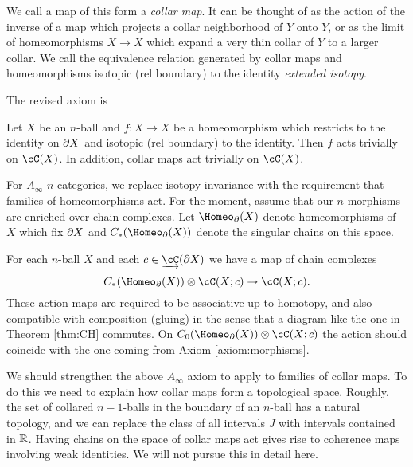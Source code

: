 We call a map of this form a {\it collar map}.
It can be thought of as the action of the inverse of
a map which projects a collar neighborhood of $Y$ onto $Y$,
or as the limit of homeomorphisms $X\to X$ which expand a very thin collar of $Y$
to a larger collar.
We call the equivalence relation generated by collar maps and homeomorphisms
isotopic (rel boundary) to the identity {\it extended isotopy}.

The revised axiom is

\begin{axiom}
\label{axiom:extended-isotopies}
Let $X$ be an $n$-ball and $f: X\to X$ be a homeomorphism which restricts
to the identity on $\partial X$ and isotopic (rel boundary) to the identity.
Then $f$ acts trivially on $\cC(X)$.
In addition, collar maps act trivially on $\cC(X)$.
\end{axiom}

\smallskip

For $A_\infty$ $n$-categories, we replace
isotopy invariance with the requirement that families of homeomorphisms act.
For the moment, assume that our $n$-morphisms are enriched over chain complexes.
Let $\Homeo_\bd(X)$ denote homeomorphisms of $X$ which fix $\partial X$ and
$C_*(\Homeo_\bd(X))$ denote the singular chains on this space.


\begin{axiom}
\label{axiom:families}
For each $n$-ball $X$ and each $c\in \cl{\cC}(\bd X)$ we have a map of chain complexes
\[
	C_*(\Homeo_\bd(X))\ot \cC(X; c) \to \cC(X; c) .
\]
These action maps are required to be associative up to homotopy,
and also compatible with composition (gluing) in the sense that
a diagram like the one in Theorem \ref{thm:CH} commutes.
On $C_0(\Homeo_\bd(X))\ot \cC(X; c)$ the action should coincide 
with the one coming from Axiom \ref{axiom:morphisms}.
\end{axiom}

We should strengthen the above $A_\infty$ axiom to apply to families of collar maps.
To do this we need to explain how collar maps form a topological space.
Roughly, the set of collared $n{-}1$-balls in the boundary of an $n$-ball has a natural topology,
and we can replace the class of all intervals $J$ with intervals contained in $\mathbb{R}$.
Having chains on the space of collar maps act gives rise to coherence maps involving
weak identities.
We will not pursue this in detail here.

